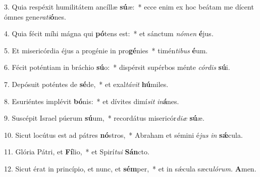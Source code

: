 \item 3. Quia respéxit humilitátem ancíllæ \textbf{sú}æ:~* ecce enim ex hoc beátam me dícent ómnes gene\textit{rati}\textbf{ó}nes.

\item 4. Quia fécit míhi mágna qui \textbf{pó}tens est:~* et sánctum \textit{nómen} \textbf{é}jus.

\item 5. Et misericórdia éjus a progénie in pro\textbf{gé}nies~* timén\textit{tibus} \textbf{é}um.

\item 6. Fécit poténtiam in bráchio \textbf{sú}o:~* dispérsit supérbos ménte \textit{córdis} \textbf{sú}i.

\item 7. Depósuit poténtes de \textbf{sé}de,~* et exal\textit{távit} \textbf{hú}miles.

\item 8. Esuriéntes implévit \textbf{bó}nis:~* et dívites dimí\textit{sit} \textit{in}\textbf{á}nes.

\item 9. Suscépit Israel púerum \textbf{sú}um,~* recordátus misericór\textit{diæ} \textbf{sú}æ.

\item 10. Sicut locútus est ad pátres \textbf{nó}stros,~* Abraham et sémini é\textit{jus} \textit{in} \textbf{sǽ}cula.

\item 11. Glória Pátri, et \textbf{Fí}lio,~* et Spirí\textit{tui} \textbf{Sán}cto.

\item 12. Sicut érat in princípio, et nunc, et \textbf{sém}per,~* et in sǽcula sæcu\textit{lórum.} \textbf{A}men.